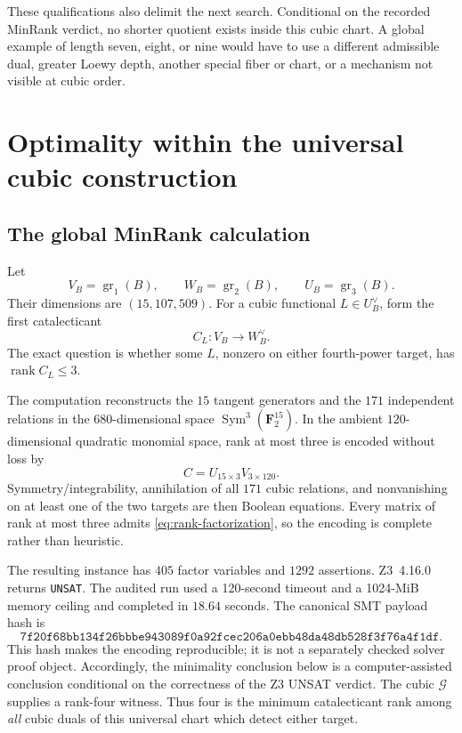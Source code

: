 \documentclass[11pt]{article}
\theoremstyle{remark}
\newcommand{\F}{\mathbf F}
\newcommand{\gr}{\operatorname{gr}}
\begin{document}
These qualifications also delimit the next search.  Conditional on the
recorded MinRank verdict, no shorter quotient exists inside this cubic
chart.  A global example of length seven, eight, or nine would have to use a
different admissible dual, greater Loewy depth, another special fiber or
chart, or a mechanism not visible at cubic order.

\section{Optimality within the universal cubic construction}
\label{sec:minimality}

\subsection{The global MinRank calculation}

Let
\[
 V_B=\gr_1(B),\qquad W_B=\gr_2(B),\qquad U_B=\gr_3(B).
\]
Their dimensions are \((15,107,509)\).  For a cubic functional
\(L\in U_B^\vee\), form the first catalecticant
\[
 C_L:V_B\longrightarrow W_B^\vee.
\]
The exact question is whether some \(L\), nonzero on either fourth-power
target, has \(\operatorname{rank}C_L\le3\).

The computation reconstructs the \(15\) tangent generators and the \(171\)
independent relations in the \(680\)-dimensional space
\(\operatorname{Sym}^3(\F_2^{15})\).  In the ambient \(120\)-dimensional
quadratic monomial space, rank at most three is encoded without loss by
\begin{equation}\label{eq:rank-factorization}
 C=U_{15\times3}V_{3\times120}.
\end{equation}
Symmetry/integrability, annihilation of all \(171\) cubic relations, and
nonvanishing on at least one of the two targets are then Boolean equations.
Every matrix of rank at most three admits \eqref{eq:rank-factorization}, so
the encoding is complete rather than heuristic.

The resulting instance has \(405\) factor variables and \(1292\) assertions.
Z3~4.16.0 returns \texttt{UNSAT}.  The audited run used a 120-second timeout
and a 1024-MiB memory ceiling and completed in \(18.64\) seconds.  The
canonical SMT payload hash is
\[
\texttt{7f20f68bb134f26bbbe943089f0a92fcec206a0ebb48da48db528f3f76a4f1df}.
\]
This hash makes the encoding reproducible; it is not a separately checked
solver proof object.  Accordingly, the minimality conclusion below is a
computer-assisted conclusion conditional on the correctness of the Z3
UNSAT verdict.
The cubic \(\mathcal G\) supplies a rank-four witness.  Thus four is the
minimum catalecticant rank among \emph{all} cubic duals of this universal
chart which detect either target.
\end{document}
